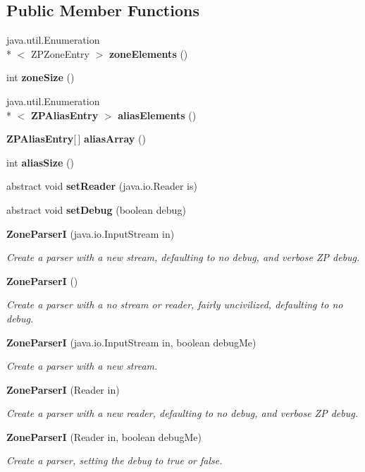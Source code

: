 \subsection*{Public Member Functions}
\begin{DoxyCompactItemize}
\item 
java.\+util.\+Enumeration\\*
$<$ Z\+P\+Zone\+Entry $>$ {\bf zone\+Elements} ()
\item 
int {\bf zone\+Size} ()
\item 
java.\+util.\+Enumeration\\*
$<$ {\bf Z\+P\+Alias\+Entry} $>$ {\bf alias\+Elements} ()
\item 
{\bf Z\+P\+Alias\+Entry}[$\,$] {\bf alias\+Array} ()
\item 
int {\bf alias\+Size} ()
\item 
abstract void {\bf set\+Reader} (java.\+io.\+Reader is)
\item 
abstract void {\bf set\+Debug} (boolean debug)
\item 
{\bf Zone\+Parser\+I} (java.\+io.\+Input\+Stream in)
\begin{DoxyCompactList}\small\item\em Create a parser with a new stream, defaulting to no debug, and verbose Z\+P debug. \end{DoxyCompactList}\item 
{\bf Zone\+Parser\+I} ()
\begin{DoxyCompactList}\small\item\em Create a parser with a no stream or reader, fairly uncivilized, defaulting to no debug. \end{DoxyCompactList}\item 
{\bf Zone\+Parser\+I} (java.\+io.\+Input\+Stream in, boolean debug\+Me)
\begin{DoxyCompactList}\small\item\em Create a parser with a new stream. \end{DoxyCompactList}\item 
{\bf Zone\+Parser\+I} (Reader in)
\begin{DoxyCompactList}\small\item\em Create a parser with a new reader, defaulting to no debug, and verbose Z\+P debug. \end{DoxyCompactList}\item 
{\bf Zone\+Parser\+I} (Reader in, boolean debug\+Me)
\begin{DoxyCompactList}\small\item\em Create a parser, setting the debug to true or false. \end{DoxyCompactList}\item 

\end{DoxyCompactItemize}
